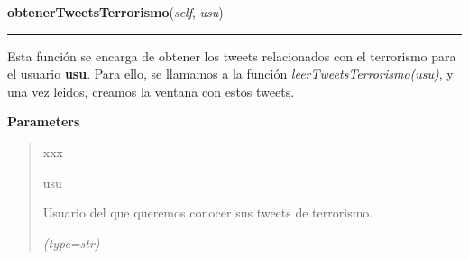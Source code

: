 \hspace{.8\funcindent}\begin{boxedminipage}{\funcwidth}

    \raggedright \textbf{obtenerTweetsTerrorismo}(\textit{self}, \textit{usu})

    \vspace{-1.5ex}

    \rule{\textwidth}{0.5\fboxrule}
\setlength{\parskip}{2ex}
    Esta función se encarga de obtener los tweets relacionados con el 
    terrorismo para el usuario \textbf{usu}. Para ello, se llamamos a la 
    función \textit{leerTweetsTerrorismo(usu)}, y una vez leidos, creamos 
    la ventana con estos tweets.

\setlength{\parskip}{1ex}
      \textbf{Parameters}
      \vspace{-1ex}

      \begin{quote}
        \begin{Ventry}{xxx}

          \item[usu]

          Usuario del que queremos conocer sus tweets de terrorismo.

            {\it (type=str)}

        \end{Ventry}

      \end{quote}

    \end{boxedminipage}

    \label{funcionesTwitter:FuncionesTwitter:leerTweetsTerrorismo}

    \vspace{0.5ex}

